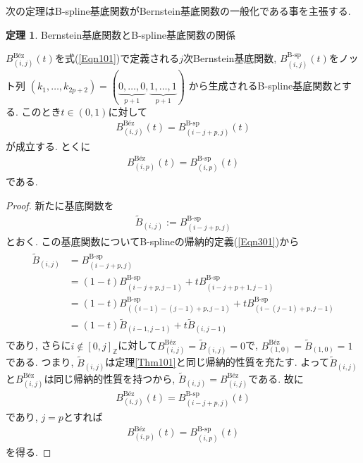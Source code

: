 \documentclass{jsarticle}
\newcommand\squa[1]{[#1]}
\newcommand\Z[2]{\squa{#1,#2}_\mathbb{Z}}
\theoremstyle{definition}%
\newtheorem{thm}{定理}
\begin{document}
\newpage
次の定理はB-spline基底関数がBernstein基底関数の一般化である事を主張する.
\begin{screen}
	\begin{thm}
		\label{Thm307}
		Bernstein基底関数とB-spline基底関数の関係

		$B_{(i,j)}^{\text{B\'ez}}(t)$を式(\ref{Eqn101})で定義される$j$次Bernstein基底関数,
		$B_{(i,j)}^{\text{B-sp}}(t)$をノット列
		$
			(k_1,\dots,k_{2p+2})
			=
			(
			\underbrace{0,\dots,0}_{p+1},
			\underbrace{1,\dots,1}_{p+1}
			)
		$
		から生成されるB-spline基底関数とする.
		このとき$t\in (0,1)$に対して
		\begin{align}
			B_{(i,j)}^{\text{B\'ez}}(t)=B_{(i-j+p,j)}^{\text{B-sp}}(t)
		\end{align}
		が成立する.
		とくに
		\begin{align}
			B_{(i,p)}^{\text{B\'ez}}(t)=B_{(i,p)}^{\text{B-sp}}(t)
		\end{align}
		である.
	\end{thm}
\end{screen}
\begin{proof}
	新たに基底関数を
	\begin{align}
		\tilde{B}_{(i,j)}:=B_{(i-j+p,j)}^{\text{B-sp}}
	\end{align}
	とおく.
	この基底関数についてB-splineの帰納的定義(\ref{Eqn301})から
	\begin{align}
		\begin{aligned}
			\tilde{B}_{(i,j)}
			&=B_{(i-j+p,j)}^{\text{B-sp}} \\
			&=(1-t)B_{(i-j+p,j-1)}^{\text{B-sp}}+tB_{(i-j+p+1,j-1)}^{\text{B-sp}} \\
			&=(1-t)B_{((i-1)-(j-1)+p,j-1)}^{\text{B-sp}}+tB_{(i-(j-1)+p,j-1)}^{\text{B-sp}} \\
			&=(1-t)\tilde{B}_{(i-1,j-1)}+t\tilde{B}_{(i,j-1)}
		\end{aligned}
	\end{align}
	であり, さらに$i\notin \Z{0}{j}$に対して$B_{(i,j)}^{\text{B\'ez}}=\tilde{B}_{(i,j)}=0$で, $B_{(1,0)}^{\text{B\'ez}}=\tilde{B}_{(1,0)}=1$である.
    つまり, $\tilde{B}_{(i,j)}$は定理\ref{Thm101}と同じ帰納的性質を充たす.
	よって$\tilde{B}_{(i,j)}$と$B_{(i,j)}^{\text{B\'ez}}$は同じ帰納的性質を持つから, $\tilde{B}_{(i,j)}=B_{(i,j)}^{\text{B\'ez}}$である.
	故に
	\begin{align}
		B_{(i,j)}^{\text{B\'ez}}(t)=B_{(i-j+p,j)}^{\text{B-sp}}(t)
	\end{align}
	であり, $j=p$とすれば
	\begin{align}
		B_{(i,p)}^{\text{B\'ez}}(t)=B_{(i,p)}^{\text{B-sp}}(t)
	\end{align}
	を得る.\footnotemark
\end{proof}
\end{document}
